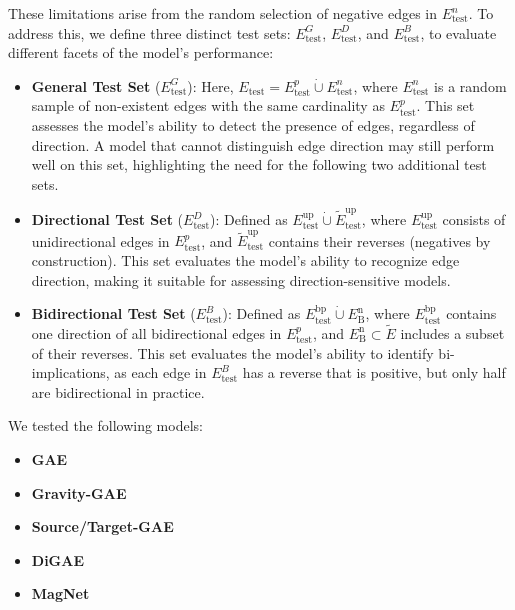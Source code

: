 These limitations arise from the random selection of negative edges in $E_{\text{test}}^n$.
To address this, we define three distinct test sets: $E_{\text{test}}^G$, $E_{\text{test}}^D$,
and $E_{\text{test}}^B$, to evaluate different facets of the model’s performance:

\begin{itemize}
    \item \textbf{General Test Set} ($E_{\text{test}}^G$):
    Here, $E_{\text{test}} = E_{\text{test}}^p \dot{\cup} E_{\text{test}}^n$, where $E_{\text{test}}^n$
    is a random sample of non-existent edges with the same cardinality as $E_{\text{test}}^p$.
    This set assesses the model's ability to detect the presence of edges, regardless of direction.
    A model that cannot distinguish edge direction may still perform well on this set, highlighting
    the need for the following two additional test sets.
    \item \textbf{Directional Test Set} ($E_{\text{test}}^D$):
    Defined as $E_{\text{test}}^{\text{up}} \dot{\cup} \tilde{E}_{\text{test}}^{\text{up}}$,
    where $E_{\text{test}}^{\text{up}}$ consists of unidirectional edges in $E_{\text{test}}^p$,
    and $\tilde{E}_{\text{test}}^{\text{up}}$ contains their reverses (negatives by construction).
    This set evaluates the model's ability to recognize edge direction, making it suitable for
    assessing direction-sensitive models.
    \item \textbf{Bidirectional Test Set} ($E_{\text{test}}^B$):
    Defined as $E_{\text{test}}^{\text{bp}} \dot{\cup} E_{\text{B}}^{\text{n}}$,
    where $E_{\text{test}}^{\text{bp}}$ contains one direction of all bidirectional edges in $E_{\text{test}}^p$,
    and $E_{\text{B}}^{\text{n}} \subset \tilde{E}$ includes a subset of their reverses.
    This set evaluates the model's ability to identify bi-implications, as each edge in $E_{\text{test}}^B$
    has a reverse that is positive, but only half are bidirectional in practice.
\end{itemize}

We tested the following models:

\begin{itemize}
    \item \textbf{GAE}~\cite{Kipf2016}
    \item \textbf{Gravity-GAE}~\cite{Salha2019}
    \item \textbf{Source/Target-GAE}~\cite{Salha2019}
    \item \textbf{DiGAE}~\cite{Kollias2022}
    \item \textbf{MagNet}~\cite{Zhang2021}
\end{itemize}

